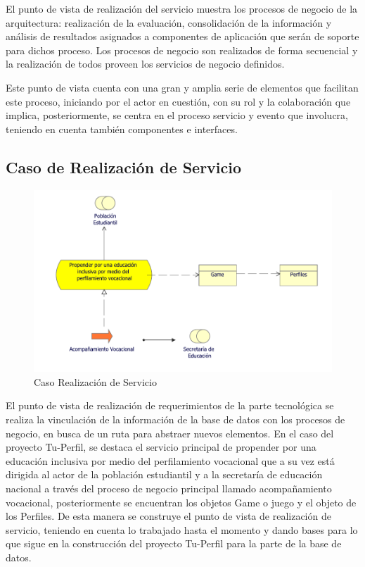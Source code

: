 El punto de vista de realización del servicio muestra los procesos de negocio de la arquitectura: realización de la evaluación, consolidación de la información y análisis de resultados asignados a componentes de aplicación que serán de soporte para dichos proceso. Los procesos de negocio son realizados de forma secuencial y la realización de todos proveen los servicios de negocio definidos.

Este punto de vista cuenta con una gran y amplia serie de elementos que facilitan este proceso, iniciando por el actor en cuestión, con su rol y la colaboración que implica, posteriormente, se centra en el proceso servicio y evento que involucra, teniendo en cuenta también componentes e interfaces.


\subsection{Caso  de Realización de Servicio}
\begin{figure}[h!]
	\centering
	\includegraphics[width=1.05\linewidth]{imgs/caso/RealizaServicio}
	\caption{Caso Realización de Servicio}
\end{figure}

El punto de vista de realización de requerimientos de la parte tecnológica se realiza la vinculación de la información de la base de datos con los procesos de negocio, en busca de un ruta para abstraer nuevos elementos. En el caso del proyecto Tu-Perfil, se destaca el servicio principal de propender por una educación inclusiva por medio del perfilamiento vocacional que a su vez está dirigida al actor de la población estudiantil y a la secretaría de educación nacional a través del proceso de negocio principal llamado acompañamiento vocacional, posteriormente se encuentran los objetos Game o juego y el objeto de los Perfiles. De esta manera se construye el punto de vista de realización de servicio, teniendo en cuenta lo trabajado hasta el momento y dando bases para lo que sigue en la construcción del proyecto Tu-Perfil para la parte de la base de datos.

\clearpage